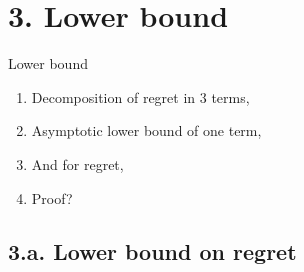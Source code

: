 \documentclass[12pt,english,ignorenonframetext,aspectratio=169,]{beamer}
\providecommand{\tightlist}{%
  \setlength{\itemsep}{0pt}\setlength{\parskip}{0pt}}
\begin{document}
\section{\hfill{}3. Lower bound\hfill{}}

\begin{frame}{Lower bound}

\begin{enumerate}
\def\labelenumi{\arabic{enumi}.}
\tightlist
\item
  Decomposition of regret in \(3\) terms,\vspace*{15pt}
\item
  Asymptotic lower bound of one term,\vspace*{15pt}
\item
  And for regret,\vspace*{15pt}
\item
  Proof?
\end{enumerate}

\end{frame}



\subsection{\hfill{}3.a. Lower bound on regret\hfill{}}
\end{document}
